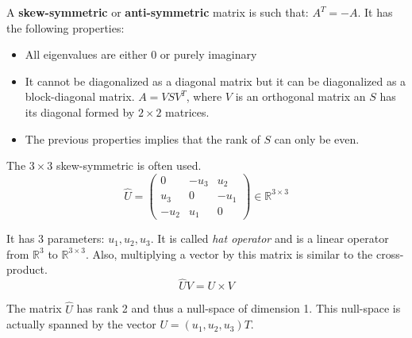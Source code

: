 A \textbf{skew-symmetric} or \textbf{anti-symmetric} matrix is such that: $A^T = -A$. It has the following properties:

\begin{itemize}
    \item All eigenvalues are either 0 or purely imaginary
    \item It cannot be diagonalized as a diagonal matrix but it can be diagonalized as a block-diagonal matrix.
    $A = V S V^T$, where $V$ is an orthogonal matrix an $S$ has its diagonal formed by $2\times 2$ matrices.
    \item The previous properties implies that the rank of $S$ can only be even.
\end{itemize}

The $3\times 3$ skew-symmetric is often used.
\begin{equation}
    \hat{U} = \left( \begin{array}{ccc}
        0 & -u_3 & u_2 \\
        u_3 & 0 & -u_1 \\
        -u_2 & u_1 & 0 
    \end{array} \right)
    \in \mathbb{R}^{3\times 3}
\end{equation}

It has 3 parameters: $u_1, u_2, u_3$.
It is called \textit{hat operator} and is a linear operator from $\mathbb{R}^3$ to $\mathbb{R}^{3\times 3}$. Also, multiplying a vector by this matrix is similar to the cross-product.
\begin{equation}
    \hat{U} V = U \times V
\end{equation}

The matrix $\hat{U}$ has rank 2 and thus a null-space of dimension 1. This null-space is actually spanned by the vector $U = (u_1, u_2, u_3)T$.


